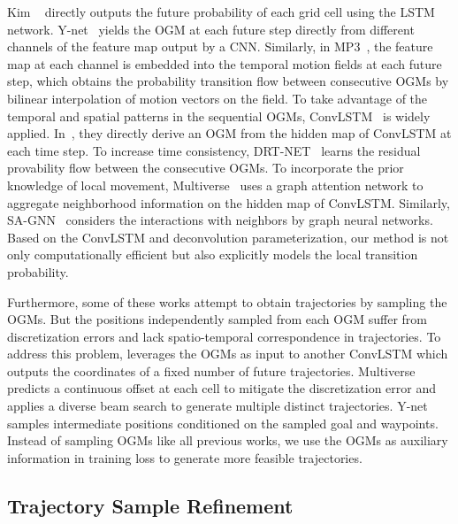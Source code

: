 \documentclass[10pt,twocolumn,letterpaper]{article}
\begin{document}
Kim \etal~\cite{kim2017probabilistic} directly outputs the future probability of each grid cell using the LSTM network. Y-net~\cite{mangalam2021goals} yields the OGM at each future step directly from different channels of the feature map output by a CNN. Similarly, in MP3~\cite{casas2021mp3}, the feature map at each channel is embedded into the temporal motion fields at each future step, which obtains the probability transition flow between consecutive OGMs by bilinear interpolation of motion vectors on the field. To take advantage of the temporal and spatial patterns in the sequential OGMs, ConvLSTM~\cite{xingjian2015convolutional} is widely applied. In~\cite{ridel2020scene}, they directly derive an OGM from the hidden map of ConvLSTM at each time step. To increase time consistency, DRT-NET~\cite{jain2020discrete} learns the residual provability flow between the consecutive OGMs. To incorporate the prior knowledge of local movement, Multiverse~\cite{liang2020garden} uses a graph attention network to aggregate neighborhood information on the hidden map of ConvLSTM. Similarly, SA-GNN~\cite{luo2021safety} considers the interactions with neighbors by graph neural networks. Based on the ConvLSTM and deconvolution parameterization, our method is not only computationally efficient but also explicitly models the local transition probability.

Furthermore, some of these works attempt to obtain trajectories by sampling the OGMs. But the positions independently sampled from each OGM suffer from discretization errors and lack spatio-temporal correspondence in trajectories. To address this problem, \cite{ridel2020scene} leverages the OGMs as input to another ConvLSTM which outputs the coordinates of a fixed number of future trajectories. Multiverse~\cite{liang2020garden} predicts a continuous offset at each cell to mitigate the discretization error and applies a diverse beam search to generate multiple distinct trajectories. Y-net~\cite{mangalam2021goals} samples intermediate positions conditioned on the sampled goal and waypoints. Instead of sampling OGMs like all previous works, we use the OGMs as auxiliary information in training loss to generate more feasible trajectories.

\subsection{Trajectory Sample Refinement}
\end{document}
